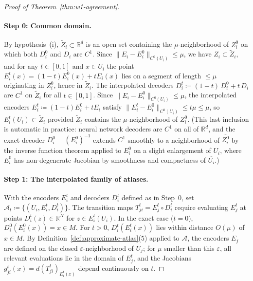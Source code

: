 \documentclass[11pt]{article}
\newcommand{\R}{\mathbb{R}}
\theoremstyle{plain}
\theoremstyle{definition}
\theoremstyle{remark}
\begin{document}
\begin{appendices}
\begin{proof}[Proof of Theorem~\ref{thm:w1-agreement}]
\paragraph{Step 0: Common domain.}
By hypothesis~(i), $\widetilde{Z}_i \subset \R^d$ is an open set containing the $\mu$-neighborhood of $Z_i^0$ on which both $D_i^0$ and $D_i$ are $C^1$. Since $\|E_i - E_i^0\|_{C^0(U_i)} \leq \mu$, we have $Z_i \subset \widetilde{Z}_i$, and for any $t \in [0,1]$ and $x \in U_i$ the point $E_i^t(x) = (1-t)E_i^0(x) + tE_i(x)$ lies on a segment of length $\leq \mu$ originating in $Z_i^0$, hence in $\widetilde{Z}_i$. The interpolated decoders $D_i^t \coloneqq (1-t)\,D_i^0 + t\,D_i$ are $C^1$ on $\widetilde{Z}_i$ for all $t \in [0,1]$. Since $\|E_i - E_i^0\|_{C^0(U_i)} \leq \mu$, the interpolated encoders $E_i^t \coloneqq (1-t)E_i^0 + t E_i$ satisfy $\|E_i^t - E_i^0\|_{C^0(U_i)} \leq t\mu \leq \mu$, so $E_i^t(U_i) \subset \widetilde{Z}_i$ provided $\widetilde{Z}_i$ contains the $\mu$-neighborhood of $Z_i^0$. (This last inclusion is automatic in practice: neural network decoders are $C^1$ on all of $\R^d$, and the exact decoder $D_i^0 = (E_i^0)^{-1}$ extends $C^1$-smoothly to a neighborhood of $\overline{Z_i^0}$ by the inverse function theorem applied to $E_i^0$ on a slight enlargement of $U_i$, where $E_i^0$ has non-degenerate Jacobian by smoothness and compactness of $\overline{U_i}$.)
\paragraph{Step 1: The interpolated family of atlases.}
With the encoders $E_i^t$ and decoders $D_i^t$ defined as in Step~0, set $\mathcal{A}_t \coloneqq \{(U_i, E_i^t, D_i^t)\}$. The transition maps $T_{ji}^t = E_j^t \circ D_i^t$ require evaluating $E_j^t$ at points $D_i^t(z) \in \R^N$ for $z \in E_i^t(U_i)$. In the exact case ($t = 0$), $D_i^0(E_i^0(x)) = x \in M$. For $t > 0$, $D_i^t(E_i^t(x))$ lies within distance $O(\mu)$ of $x \in M$. By Definition~\ref{def:approximate-atlas}(5) applied to $\mathcal{A}$, the encoders $E_j$ are defined on the closed $\varepsilon$-neighborhood of $U_j$; for $\mu$ smaller than this $\varepsilon$, all relevant evaluations lie in the domain of $E_j^t$, and the Jacobians $g_{ji}^t(x) = d(T_{ji}^t)_{E_i^t(x)}$ depend continuously on $t$.


\end{proof}
\end{appendices}
\end{document}
